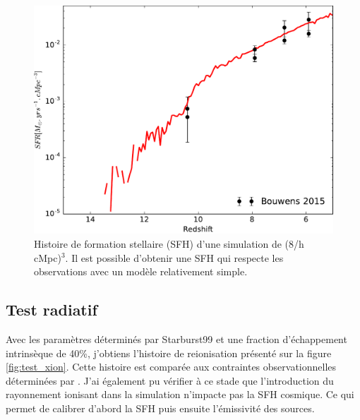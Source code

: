 \begin{figure}
        \includegraphics[width=.95\linewidth]{img/02/SFR.pdf}
        \caption[Histoire de formation stellaire]{Histoire de formation stellaire (SFH) d'une simulation de (8/h cMpc)$^3$.
        Il est possible d'obtenir une SFH qui respecte les observations avec un modèle relativement simple.
}
 		\label{fig:test_SFH}
\end{figure}


\subsection{Test radiatif}
Avec les paramètres déterminés par Starburst99 et une fraction d'échappement intrinsèque de 40\%, j'obtiens l'histoire de reionisation présenté sur la figure \ref{fig:test_xion}.
Cette histoire est comparée aux contraintes observationnelles déterminées par \cite{fan_constraining_2006}.
J'ai également pu vérifier à ce stade que l'introduction du rayonnement ionisant dans la simulation n'impacte pas la \ac{SFH} cosmique.
Ce qui permet de calibrer d'abord la \ac{SFH} puis ensuite l'émissivité des sources.

